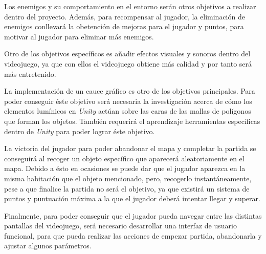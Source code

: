 Los enemigos y su comportamiento en el entorno serán otros objetivos a realizar dentro del proyecto. Además, para recompensar al jugador, la eliminación de enemigos conllevará la obetención de mejoras para el jugador y puntos, para motivar al jugador para eliminar más enemigos. 

Otro de los objetivos específicos es añadir efectos visuales y sonoros dentro del videojuego, ya que con ellos el videojuego obtiene más calidad y por tanto será más entretenido.

La implementación de un cauce gráfico es otro de los objetivos principales. Para poder conseguir éste objetivo será necesaria la investigación acerca de cómo los elementos lumínicos en \textit{Unity} actúan sobre las caras de las mallas de polígonos que forman los objetos. También requerirá el aprendizaje herramientas específicas dentro de \textit{Unity} para poder lograr éste objetivo.

La victoria del jugador para poder abandonar el mapa y completar la partida se conseguirá al recoger un objeto específico que aparecerá aleatoriamente en el mapa. Debido a ésto en ocasiones se puede dar que el jugador aparezca en la misma habitación que el objeto mencionado, pero, recogerlo instantáneamente, pese a que finalice la partida no será el objetivo, ya que existirá un sistema de puntos y puntuación máxima a la que el jugador deberá intentar llegar y superar.

Finalmente, para poder conseguir que el jugador pueda navegar entre las distintas pantallas del videojuego, será necesario desarrollar una interfaz de usuario funcional, para que pueda realizar las acciones de empezar partida, abandonarla y ajustar algunos parámetros.
